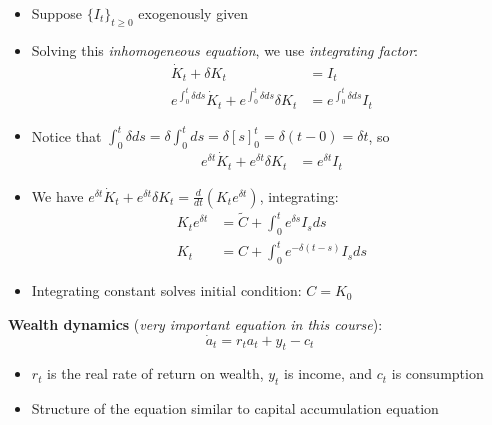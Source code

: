 \documentclass[10pt]{beamer}
\begin{document}
\begin{frame}{}

\begin{itemize}
\item Suppose $\{ I_t \}_{t \geq 0}$ exogenously given

\item Solving this \textit{inhomogeneous equation}, we use \textit{integrating factor}:
\begin{align*}
	\dot K_t + \delta K_t &= I_t  \\
	e^{\int_0^t \delta ds} \dot K_t + e^{\int_0^t \delta ds} \delta K_t &= e^{\int_0^t \delta ds} I_t
\end{align*}

\item Notice that $\int_0^t \delta ds = \delta \int_0^t ds = \delta [s]_0^t = \delta(t - 0) = \delta t$, so 
\begin{align*}
	e^{\delta t} \dot K_t + e^{\delta t} \delta K_t &= e^{\delta t} I_t
\end{align*}

\item We have $e^{\delta t} \dot K_t + e^{\delta t} \delta K_t = \frac{d}{dt} (K_t e^{\delta t})$, integrating:
\begin{align*}
	K_t e^{\delta t} &= \tilde C + \int_0^t e^{\delta s} I_s ds \\
	K_t &= C + \int_0^t e^{- \delta(t-s)} I_s ds
\end{align*}

\item Integrating constant solves initial condition: $C = K_0$
\end{itemize}
\end{frame}



\begin{frame}{}
\textbf{Wealth dynamics} (\textit{very important equation in this course}):
\begin{equation*}
	\dot a_t = r_t a_t + y_t - c_t
\end{equation*}
\begin{itemize}
\item $r_t$ is the real rate of return on wealth, $y_t$ is income, and $c_t$ is consumption

\item Structure of the equation similar to capital accumulation equation
\end{itemize}
\end{frame}
\end{document}
